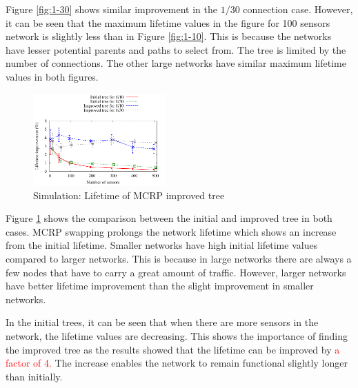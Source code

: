 Figure \ref{fig:1-30} shows similar improvement in the $1/30$ connection case. However, it can be seen that the maximum lifetime values in the figure for 100 sensors network is slightly less than in Figure \ref{fig:1-10}. This is because the networks have lesser potential parents and paths to select from. The tree is limited by the number of connections. The other large networks have similar maximum lifetime values in both figures.

\begin{figure}
\centering
\includegraphics[width=0.45\textwidth]{figures/maxmin.pdf}
\caption{Simulation: Lifetime of MCRP improved tree}
\label{fig:nodes-maxmin}
\end{figure}

Figure \ref{fig:nodes-maxmin} shows the comparison between the initial and improved tree in both cases. MCRP swapping prolongs the network lifetime which shows an increase from the initial lifetime. Smaller networks have high initial lifetime values compared to larger networks.  This is because in large networks there are always a few nodes that have to carry a great amount of traffic.  However, larger networks have better lifetime improvement than the slight improvement in smaller networks.

In the initial trees, it can be seen that when there are more sensors in the network, the lifetime values are decreasing. This shows the importance of finding the improved tree as the results showed that the lifetime can be improved by \textcolor{red}{a factor of 4.}
The increase enables the network to remain functional slightly longer than initially. 

